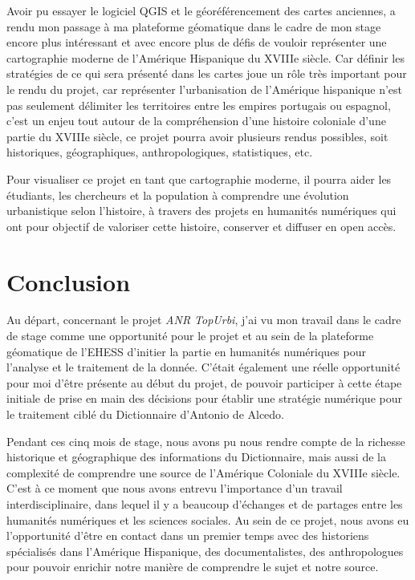 \documentclass[a4paper,12pt,twoside]{book}
\begin{document}
Avoir pu essayer le logiciel QGIS et le géoréférencement des cartes anciennes, a rendu mon passage à ma plateforme géomatique dans le cadre de mon stage encore plus intéressant et avec encore plus de défis de vouloir représenter une cartographie moderne de l’Amérique Hispanique du XVIIIe siècle. Car définir les stratégies de ce qui sera présenté dans les cartes joue un rôle très important pour le rendu du projet, car représenter l’urbanisation de l’Amérique hispanique n’est pas seulement délimiter les territoires entre les empires portugais ou espagnol, c’est un enjeu tout autour de la compréhension d’une histoire coloniale d’une partie du XVIIIe siècle, ce projet pourra avoir plusieurs rendus possibles, soit historiques, géographiques, anthropologiques, statistiques, etc. 

Pour visualiser ce projet en tant que cartographie moderne, il pourra aider les étudiants, les chercheurs et la population à comprendre une évolution urbanistique selon l’histoire, à travers des projets en humanités numériques qui ont pour objectif de valoriser cette histoire, conserver et diffuser en open accès. 
	
	\chapter*{Conclusion}

Au départ, concernant le projet \textit{ANR TopUrbi}, j’ai vu mon travail dans le cadre de stage comme une opportunité pour le projet et au sein de la plateforme géomatique de l’\Gls{EHESS} d’initier la partie en humanités numériques pour l’analyse et le traitement de la donnée. C’était également une réelle opportunité pour moi d’être présente au début du projet, de pouvoir participer à cette étape initiale de prise en main des décisions pour établir une stratégie numérique pour le traitement ciblé du Dictionnaire d’Antonio de Alcedo. 

Pendant ces cinq mois de stage, nous avons pu nous rendre compte de la richesse historique et géographique des informations du Dictionnaire, mais aussi de la complexité de comprendre une source de l’Amérique Coloniale du XVIIIe siècle. C’est à ce moment que nous avons entrevu l’importance d’un travail interdisciplinaire, dans lequel il y a beaucoup d’échanges et de partages entre les humanités numériques et les sciences sociales. Au sein de ce projet, nous avons eu l’opportunité d’être en contact dans un premier temps avec des historiens spécialisés dans l’Amérique Hispanique, des documentalistes, des anthropologues pour pouvoir enrichir notre manière de comprendre le sujet et notre source. 
\end{document}
